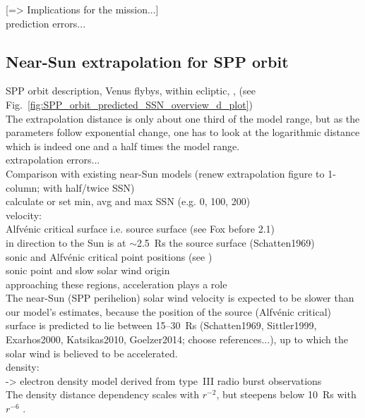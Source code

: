 [=> Implications for the mission...]\\

prediction errors...\\

\subsection{Near-Sun extrapolation for SPP orbit}

SPP orbit description, Venus flybys, within ecliptic, \citep{Fox2015}, (see Fig.~\ref{fig:SPP_orbit_predicted_SSN_overview_d_plot})\\

The extrapolation distance is only about one third of the model range, but as the parameters follow exponential change, one has to look at the logarithmic distance which is indeed one and a half times the model range.\\

extrapolation errors...\\
Comparison with existing near-Sun models (renew extrapolation figure to 1-column; with half/twice SSN)\\
calculate or set min, avg and max SSN (e.g. 0, 100, 200)\\

velocity:\\
Alfvénic critical surface i.e. source surface (see Fox before 2.1)\\
in direction to the Sun is at $\sim$2.5~Rs the source surface (Schatten1969)\\
sonic and Alfvénic critical point positions (see \citet{Sittler1999})\\
sonic point and slow solar wind origin \citep{Sheeley1997}\\
approaching these regions, acceleration plays a role\\

The near-Sun (SPP perihelion) solar wind velocity is expected to be slower than our model's estimates, because the position of the source (Alfvénic critical) surface is predicted to lie between 15--30~Rs (Schatten1969, Sittler1999, Exarhos2000, Katsikas2010, Goelzer2014; choose references...), up to which the solar wind is believed to be accelerated.\\

density:\\
\citet{Leblanc1998} -> electron density model derived from type~III radio burst observations\\
The density distance dependency scales with $r^{-2}$, but steepens below 10~Rs with $r^{-6}$ \citep{Leblanc1998}.\\

